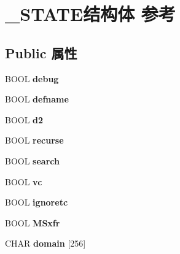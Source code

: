 \hypertarget{struct___s_t_a_t_e}{}\section{\+\_\+\+S\+T\+A\+T\+E结构体 参考}
\label{struct___s_t_a_t_e}
\subsection*{Public 属性}
\begin{DoxyCompactItemize}
\item 
\mbox{\label{struct___s_t_a_t_e_a37d5f8d44553ad5dcbd3add6bf7a40ec}} 
B\+O\+OL {\bfseries debug}
\item 
\mbox{\label{struct___s_t_a_t_e_acb3884066e2f32889a1766b1ddae73ea}} 
B\+O\+OL {\bfseries defname}
\item 
\mbox{\label{struct___s_t_a_t_e_a78057e4f879d5407567f14ac9c353cd3}} 
B\+O\+OL {\bfseries d2}
\item 
\mbox{\label{struct___s_t_a_t_e_ad5bfc09a4d7846241ae2d3e16fddb3ea}} 
B\+O\+OL {\bfseries recurse}
\item 
\mbox{\label{struct___s_t_a_t_e_a593bfec1748fb9957970dfa30a4ef47e}} 
B\+O\+OL {\bfseries search}
\item 
\mbox{\label{struct___s_t_a_t_e_a29685489b3f06562bcb7e409496d1309}} 
B\+O\+OL {\bfseries vc}
\item 
\mbox{\label{struct___s_t_a_t_e_aa4670c5cf18cd1dd8090729a7f167783}} 
B\+O\+OL {\bfseries ignoretc}
\item 
\mbox{\label{struct___s_t_a_t_e_a92dc81c214be22c2981c83f7d214d446}} 
B\+O\+OL {\bfseries M\+Sxfr}
\item 
\mbox{\label{struct___s_t_a_t_e_ae0f7832723efe65ad3fe0eb529306856}} 
C\+H\+AR {\bfseries domain} \mbox{[}256\mbox{]}
\item 
\mbox{\label{struct___s_t_a_t_e_a1b8c3fc936469583d4d06db557569cf3}} 

\end{DoxyCompactItemize}

